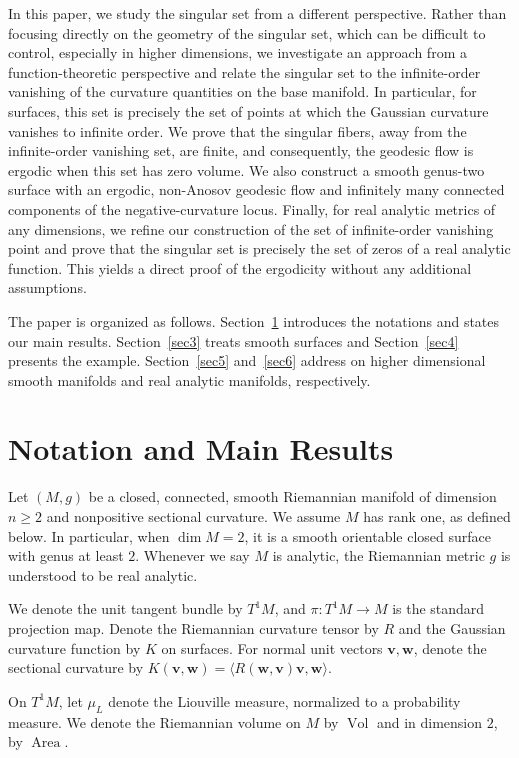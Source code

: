 \documentclass[reqno,11pt]{article}
\theoremstyle{definition}
\theoremstyle{remark}
\numberwithin{equation}{section}
\DeclareMathOperator{\area}{Area}
\DeclareMathOperator{\vol}{Vol}
\begin{document}
In this paper, we study the singular set from a different perspective. Rather than focusing directly on the geometry of the singular set, which can be difficult to control, especially in higher dimensions, we investigate an approach from a function-theoretic perspective and relate the singular set to the infinite-order vanishing of the curvature quantities on the base manifold. In particular, for surfaces, this set is precisely the set of points at which the Gaussian curvature vanishes to infinite order. We prove that the singular fibers, away from the infinite-order vanishing set, are finite, and consequently, the geodesic flow is ergodic when this set has zero volume. We also construct a smooth genus-two surface with an ergodic, non-Anosov geodesic flow and infinitely many connected components of the negative-curvature locus. Finally, for real analytic metrics of any dimensions, we refine our construction of the set of infinite-order vanishing point and prove that the singular set is precisely the set of zeros of a real analytic function. This yields a direct proof of the ergodicity without any additional assumptions.

The paper is organized as follows. Section~\ref{sec2} introduces the notations and states our main results. Section~\ref{sec3} treats smooth surfaces and Section~\ref{sec4} presents the example. Section~\ref{sec5} and~\ref{sec6} address on higher dimensional smooth manifolds and real analytic manifolds, respectively.

\section{Notation and Main Results}\label{sec2}
Let $(M,g)$ be a closed, connected, smooth Riemannian manifold of dimension $n\geq 2$ and nonpositive sectional curvature. We assume $M$ has rank one, as defined below. In particular, when $\dim M=2$, it is a smooth orientable closed surface with genus at least $2$. Whenever we say $M$ is analytic, the Riemannian metric $g$ is understood to be real analytic.

We denote the unit tangent bundle by $T^{1}M$, and $\pi: T^{1}M\to M$ is the standard projection map. Denote the Riemannian curvature tensor by $R$ and the Gaussian curvature function by $K$ on surfaces. For normal unit vectors $\bm{v},\bm{w}$, denote the sectional curvature by $K(\bm{v},\bm{w})=\langle R(\bm{w},\bm{v})\bm{v},\bm{w}\rangle$.

On $T^1M$, let $\mu_{L}$ denote the Liouville measure, normalized to a probability measure. We denote the Riemannian volume on $M$ by $\vol$ and in dimension $2$, by $\area$.
\end{document}
